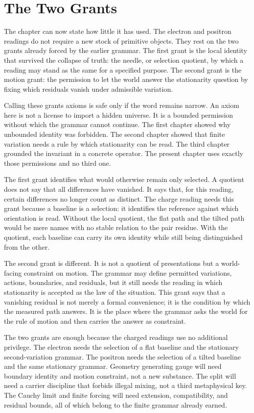 \section{The Two Grants}

The chapter can now state how little it has used. The electron and positron
readings do not require a new stock of primitive objects. They rest on the
two grants already forced by the earlier grammar. The first grant is the
local identity that survived the collapse of truth: the needle, or selection
quotient, by which a reading may stand as the same for a specified purpose.
The second grant is the motion grant: the permission to let the world answer
the stationarity question by fixing which residuals vanish under admissible
variation.

Calling these grants axioms is safe only if the word remains narrow. An
axiom here is not a license to import a hidden universe. It is a bounded
permission without which the grammar cannot continue. The first chapter
showed why unbounded identity was forbidden. The second chapter showed that
finite variation needs a rule by which stationarity can be read. The third
chapter grounded the invariant in a concrete operator. The present chapter
uses exactly those permissions and no third one.

The first grant identifies what would otherwise remain only selected. A
quotient does not say that all differences have vanished. It says that, for
this reading, certain differences no longer count as distinct. The charge
reading needs this grant because a baseline is a selection: it identifies the
reference against which orientation is read. Without the local quotient, the
flat path and the tilted path would be mere names with no stable relation to
the pair residue. With the quotient, each baseline can carry its own
identity while still being distinguished from the other.

The second grant is different. It is not a quotient of presentations but a
world-facing constraint on motion. The grammar may define permitted
variations, actions, boundaries, and residuals, but it still needs the
reading in which stationarity is accepted as the law of the situation. This
grant says that a vanishing residual is not merely a formal convenience; it
is the condition by which the measured path answers. It is the place where
the grammar asks the world for the rule of motion and then carries the
answer as constraint.

The two grants are enough because the charged readings use no additional
privilege. The electron needs the selection of a flat baseline and the
stationary second-variation grammar. The positron needs the selection of a
tilted baseline and the same stationary grammar. Geometry generating gauge
will need boundary identity and motion constraint, not a new substance.
The split will need a carrier discipline that forbids illegal mixing, not a
third metaphysical key. The Cauchy limit and finite forcing will need
extension, compatibility, and residual bounds, all of which belong to the
finite grammar already earned.

